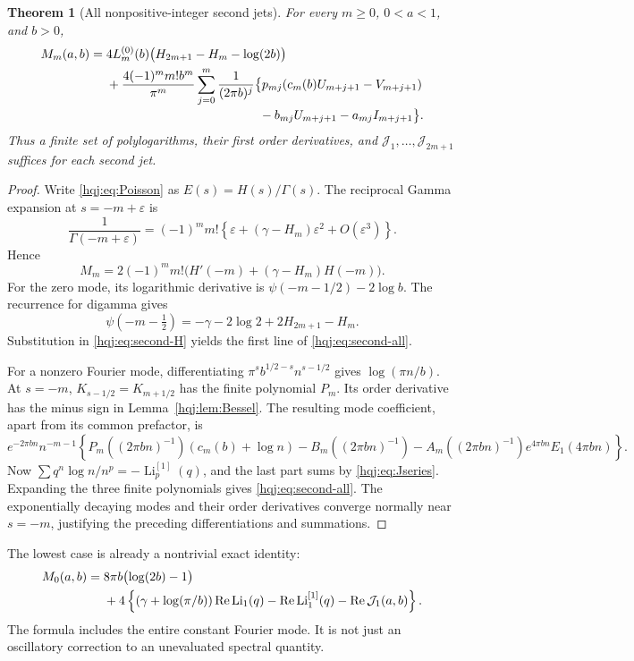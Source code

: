 \documentclass[11pt,letterpaper]{article}
\numberwithin{equation}{section}
\newtheorem{theorem}{Theorem}[section]
\theoremstyle{definition}
\newcommand{\Li}{\operatorname{Li}}
\newcommand{\Rea}{\operatorname{Re}}
\begin{document}
\begin{theorem}[All nonpositive-integer second jets]\label{hqj:thm:second}
For every $m\ge0$, $0<a<1$, and $b>0$,
\begin{align}
M_m(a,b)={}&4L_m^{(0)}(b)
\bigl(H_{2m+1}-H_m-\log(2b)\bigr)\notag\\
&+\frac{4(-1)^m m!b^m}{\pi^m}
\sum_{j=0}^m\frac1{(2\pi b)^j}
\bigl\{p_{mj}(c_m(b)U_{m+j+1}-V_{m+j+1})\notag\\[-2pt]
&\hspace{43mm}-b_{mj}U_{m+j+1}-a_{mj}I_{m+j+1}\bigr\}.
\label{hqj:eq:second-all}
\end{align}
Thus a finite set of polylogarithms, their first order derivatives, and
$\mathcal J_1,\ldots,\mathcal J_{2m+1}$ suffices for each second jet.
\end{theorem}
\begin{proof}
Write \eqref{hqj:eq:Poisson} as $E(s)=H(s)/\Gamma(s)$.
The reciprocal Gamma expansion at $s=-m+\varepsilon$ is
\[
\frac1{\Gamma(-m+\varepsilon)}
=(-1)^mm!\left\{\varepsilon+(\gamma-H_m)\varepsilon^2
+O(\varepsilon^3)\right\}.
\]
Hence
\begin{equation}\label{hqj:eq:second-H}
M_m=2(-1)^mm!\bigl(H'(-m)+(\gamma-H_m)H(-m)\bigr).
\end{equation}
For the zero mode, its logarithmic derivative is
$\psi(-m-1/2)-2\log b$. The recurrence for digamma gives
\[
\psi(-m-\tfrac12)=-\gamma-2\log2+2H_{2m+1}-H_m.
\]
Substitution in \eqref{hqj:eq:second-H} yields the first line of
\eqref{hqj:eq:second-all}.

For a nonzero Fourier mode, differentiating
$\pi^s b^{1/2-s}n^{s-1/2}$ gives $\log(\pi n/b)$.
At $s=-m$, $K_{s-1/2}=K_{m+1/2}$ has the finite polynomial $P_m$.
Its order derivative has the minus sign in Lemma~\ref{hqj:lem:Bessel}.
The resulting mode coefficient, apart from its common prefactor, is
\[
e^{-2\pi bn}n^{-m-1}
\left\{P_m((2\pi bn)^{-1})(c_m(b)+\log n)
-B_m((2\pi bn)^{-1})
-A_m((2\pi bn)^{-1})e^{4\pi bn}E_1(4\pi bn)\right\}.
\]
Now
$\sum q^n\log n/n^p=-\Li_p^{[1]}(q)$, and the last part sums by
\eqref{hqj:eq:Jseries}. Expanding the three finite polynomials gives
\eqref{hqj:eq:second-all}. The exponentially decaying modes and their
order derivatives converge normally near $s=-m$, justifying the
preceding differentiations and summations.
\end{proof}

The lowest case is already a nontrivial exact identity:
\begin{align}
M_0(a,b)={}&8\pi b\bigl(\log(2b)-1\bigr)\notag\\
&+4\left\{(\gamma+\log(\pi/b))\Rea\Li_1(q)
-\Rea\Li_1^{[1]}(q)-\Rea\mathcal J_1(a,b)\right\}.
\label{hqj:eq:M0}
\end{align}
The formula includes the entire constant Fourier mode. It is not just
an oscillatory correction to an unevaluated spectral quantity.
\end{document}
